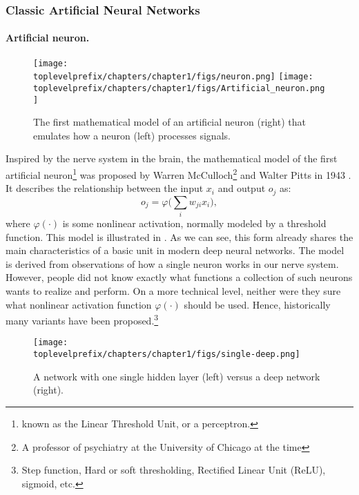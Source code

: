 \documentclass[../../book-main.tex]{subfiles}
\begin{document}
\subsubsection{Classic Artificial Neural Networks}
\paragraph{Artificial neuron.}

\begin{figure}[t]
    \centering
\texttt{[image: \\toplevelprefix/chapters/chapter1/figs/neuron.png]} \hspace{3mm}   
\texttt{[image: \\toplevelprefix/chapters/chapter1/figs/Artificial\_neuron.png]}
    \caption{The first mathematical model of an artificial neuron (right) that emulates how a neuron (left) processes signals. }
    \label{fig:neuron}
\end{figure}

Inspired by the nerve system in the brain, the mathematical model of the first artificial neuron\footnote{known as the  Linear Threshold Unit, or a perceptron.} was proposed by Warren McCulloch\footnote{A professor of psychiatry at the University of Chicago at the time} and Walter Pitts in 1943 \cite{McCulloch-Pitts}. It describes the relationship between the input $x_i$ and output $o_j$ as:
\begin{equation}
    o_j = \varphi\Big( \sum_i w_{ji}x_i\Big),  
\end{equation}
where $\varphi(\cdot)$ is some nonlinear activation, normally modeled by a threshold function. This model is illustrated in . As we can see, this form already shares the main characteristics of a basic unit in modern deep neural networks. The model is derived from observations of how a single neuron works in our nerve system. However, people did not know exactly what functions a collection of such neurons wants to realize and perform. On a more technical level, neither were they sure what nonlinear activation function $\varphi(\cdot)$ should be used. Hence, historically many variants have been proposed.\footnote{Step function, Hard or soft thresholding, Rectified Linear Unit (ReLU), sigmoid, etc.
}

\begin{figure}[t]
\centering
\texttt{[image: \\toplevelprefix/chapters/chapter1/figs/single-deep.png]}
    \caption{A network with one single hidden layer (left) versus a deep network (right).  }
    \label{fig:single-deep}
\end{figure}
\end{document}
